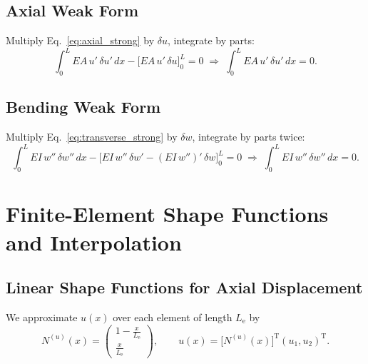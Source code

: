 \documentclass{article}
\begin{document}
	\subsection{Axial Weak Form}
	Multiply Eq.~\eqref{eq:axial_strong} by \(\delta u\), integrate by parts:
	\begin{equation}\label{eq:axial_weak}
		\int_0^L EA\,u'\,\delta u'\,dx 
		- \bigl[EA\,u'\,\delta u\bigr]_0^L = 0
		\;\Longrightarrow\;
		\int_0^L EA\,u'\,\delta u'\,dx = 0.
	\end{equation}
	
	\subsection{Bending Weak Form}
	Multiply Eq.~\eqref{eq:transverse_strong} by \(\delta w\), integrate by parts twice:
	\begin{equation}\label{eq:bending_weak}
		\int_0^L EI\,w''\,\delta w''\,dx 
		- \bigl[EI\,w''\,\delta w' - (EI\,w'')'\,\delta w\bigr]_0^L = 0
		\;\Longrightarrow\;
		\int_0^L EI\,w''\,\delta w''\,dx = 0.
	\end{equation}
	
	\section{Finite-Element Shape Functions and Interpolation}
	\subsection{Linear Shape Functions for Axial Displacement}
	We approximate \(u(x)\) over each element of length \(L_\mathrm{e}\) by
	\begin{equation}\label{eq:axial_interp}
		N^{(u)}(x)
		= \begin{pmatrix}1-\tfrac{x}{L_\mathrm{e}}\\[4pt]\tfrac{x}{L_\mathrm{e}}\end{pmatrix},
		\qquad
		u(x)=\bigl[N^{(u)}(x)\bigr]^\text{T}(u_1,u_2)^\text{T}.
	\end{equation}
	
\end{document}
